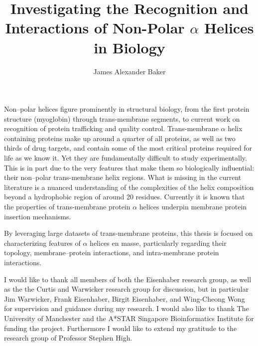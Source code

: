 \documentclass[12pt,PhD,twoside]{muthesis}
\begin{document}
\title{Investigating the Recognition and Interactions of Non-Polar $\alpha$ Helices in Biology}
\author{James Alexander Baker}
\def\wordcount{8496}
\tablespagefalse{}

\figurespagefalse{}


\beforeabstract{} %
Non\---polar helices figure prominently in structural biology, from the first protein structure (myoglobin) through trans-membrane segments, to current work on recognition of protein trafficking and quality control. Trans-membrane $\alpha$ helix containing proteins make up around a quarter of all proteins, as well as two thirds of drug targets, and contain some of the most critical proteins required for life as we know it. Yet they are fundamentally difficult to study experimentally. This is in part due to the very features that make them so biologically influential: their non\---polar trans-membrane helix regions. What is missing in the current literature is a nuanced understanding of the complexities of the helix composition beyond a hydrophobic region of around 20 residues. Currently it is known that the properties of trans-membrane protein $\alpha$ helices underpin membrane protein insertion mechanisms.

By leveraging large datasets of trans-membrane proteins, this thesis is focused on characterizing features of $\alpha$ helices en masse, particularly regarding their topology, membrane\---protein interactions, and intra-membrane protein interactions.

\afterabstract{}

I would like to thank all members of both the Eisenhaber research group, as well as the the Curtis and Warwicker research group for discussion, but in particular Jim Warwicker, Frank Eisenhaber, Birgit Eisenhaber, and Wing-Cheong Wong for supervision and guidance during my research. I would also like to thank The University of Manchester and the A*STAR Singapore Bioinformatics Institute for funding the project. Furthermore I would like to extend my gratitude to the research group of Professor Stephen High.
\end{document}
